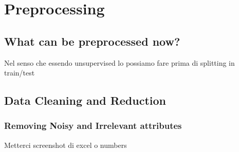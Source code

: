 \section{Preprocessing}

\subsection{What can be preprocessed now?}
Nel senso che essendo unsupervised lo possiamo fare prima di splitting in train/test

\subsection{Data Cleaning and Reduction}

\subsubsection{Removing Noisy and Irrelevant attributes}
Metterci screenshot di excel o numbers


